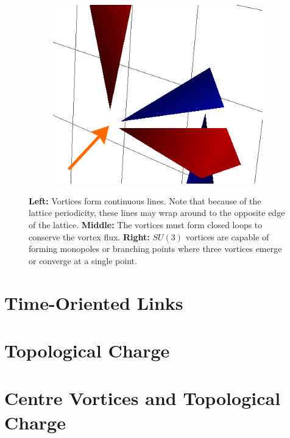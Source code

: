 \begin{figure}[htb!]
\begin{subfigure}[b]{0.3\textwidth}
    \end{subfigure}\hfill
    \begin{subfigure}[b]{0.3\textwidth}
	\includegraphics[width=\textwidth]{./plaqt1_monopole.png}
    \end{subfigure}
    \caption{\label{fig:VortexFeatures} \textbf{Left:} Vortices form continuous lines. Note that because of the lattice periodicity, these lines may wrap around to the opposite edge of the lattice. \textbf{Middle:} The vortices must form closed loops to conserve the vortex flux. \textbf{Right:} $SU(3)$ vortices are capable of forming monopoles or branching points where three vortices emerge or converge at a single point.}
  \end{figure}
\section{Time-Oriented Links}
\section{Topological Charge}
\section{Centre Vortices and Topological Charge}
